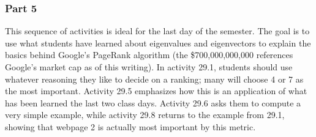 \documentclass{article}
\begin{document}
\subsubsection*{Part 5}
This sequence of activities is ideal for the last day of the semester.  The goal is to use what students have learned about eigenvalues and eigenvectors to explain the basics behind Google's PageRank algorithm (the \$700,000,000,000 references Google's market cap as of this writing).  In activity 29.1, students should use whatever reasoning they like to decide on a ranking; many will choose 4 or 7 as the most important.  Activity 29.5 emphasizes how this is an application of what has been learned the last two class days.  Activity 29.6 asks them to compute a very simple example, while activity 29.8 returns to the example from 29.1, showing that webpage 2 is actually most important by this metric.
\end{document}
